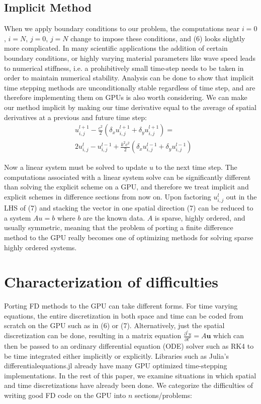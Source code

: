\documentclass[conference]{IEEEtran}
\begin{document}
\subsection{Implicit Method}

When we apply boundary conditions to our problem, the computations near $i=0$, $i=N$, $j=0$, $j=N$  change to impose these conditions, and (6) looks slightly more complicated. In many scientific applications the addition of certain boundary conditions, or highly varying material parameters like wave speed leads to numerical stiffness, i.e. a prohibitively small time-step needs to be taken in order to maintain numerical stability\cite{Lambert}. Analysis can be done to show that implicit time stepping methods are unconditionally stable regardless of time step, and are therefore implementing them on GPUs is also worth considering. We can make our method implicit by making our time derivative equal to the average of spatial derivatives at a previous and future time step:
\begin{align}
&u^{l+1}_{i,j} - \frac{c^2}{2}(\delta_x u^{l+1}_{i,j} + \delta_y u^{l+1}_{i,j}) = \\
\nonumber&2 u^l_{i,j} - u^{l-1}_{i,j} + \frac{k^2c^2}{2}(\delta_x  u^{l-1}_{i,j} + \delta_y u^{l-1}_{i,j})
\end{align}

Now a linear system must be solved  to update $u$ to the next time step. The computations associated with a linear system solve can be significantly different than solving the explicit scheme on a GPU, and therefore we treat implicit and explicit schemes in difference sections from now on. Upon factoring $u^{l}_{i,j}$ out in the LHS of (7) and stacking the vector in one spatial direction (7) can be reduced to a system $Au = b$ where $b$ are the known data. $A$ is sparse, highly ordered, and usually symmetric, meaning that the problem of porting a finite difference method to the GPU really becomes one of optimizing methods for solving sparse highly ordered systems.

\section{Characterization of difficulties}

Porting FD methods to the GPU can take different forms. For time varying equations, the entire discretization in both space and time can be coded from scratch on the GPU such as in (6) or (7). Alternatively, just the spatial discretization can be done, resulting in a matrix equation $\frac{\partial^c u}{\partial t^c} = A\boldsymbol{u}$ which can then be passed to an ordinary differential equation (ODE) solver such as RK4 to be time integrated either implicitly or explicitly. Libraries such as Julia's differentialequations.jl  already have many GPU optimized time-stepping implementations\cite{diff}. In the rest of this paper, we examine situations in which spatial and time discretizations have already been done. We categorize the difficulties of writing good FD code on the GPU into $n$ sections/problems:
\end{document}
